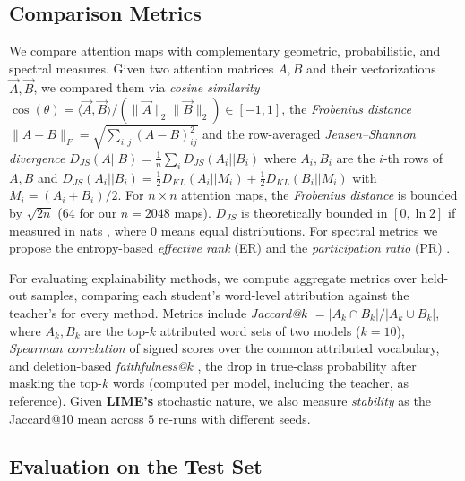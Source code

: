\documentclass[conference]{IEEEtran}
\begin{document}
\subsection{Comparison Metrics}\label{sec:metrics}

We compare attention maps with complementary geometric, probabilistic, and spectral measures. Given two attention matrices $A,B$ and their vectorizations $\vec A, \vec B$, we compared them via \textit{cosine similarity} $\cos(\theta)=\langle \vec A,\vec B\rangle/(\|\vec A\|_2\|\vec B\|_2)\in[-1,1]$, the \textit{Frobenius distance} $\|A-B\|_F=\sqrt{\sum_{i,j}(A-B)^2_{ij}}$ and the row-averaged \textit{Jensen--Shannon divergence} $D_{JS}(A||B)=\frac{1}{n}\sum_i D_{JS}(A_i||B_i)$ where $A_i, B_i$ are the $i$-th rows of $A,B$ and $D_{JS}(A_i||B_i) = \frac{1}{2}D_{KL}(A_i||M_i) + \frac{1}{2}D_{KL}(B_i||M_i)$ with $M_i = (A_i + B_i)/2$. For $n \times n$ attention maps, the \textit{Frobenius distance} is bounded by $\sqrt{2n}$ ($64$ for our $n=2048$ maps). $D_{JS}$ is theoretically bounded in $[0,\ln 2]$ if measured in nats \cite{lin1991divergence}, where $0$ means equal distributions. For spectral metrics we propose the entropy-based \textit{effective rank} (ER) \cite{roy2007effective} and the \textit{participation ratio} (PR) \cite{recanatesi2022scale}.

For evaluating explainability methods, we compute aggregate metrics over held-out samples, comparing each student's word-level attribution against the teacher's for every method. Metrics include \textit{Jaccard@$k$} $=|A_k\cap B_k|/|A_k\cup B_k|$, where $A_k,B_k$ are the top-$k$ attributed word sets of two models ($k=10$), \textit{Spearman correlation} of signed scores over the common attributed vocabulary, and deletion-based \textit{faithfulness@$k$} \cite{deyoung2020eraser}, the drop in true-class probability after masking the top-$k$ words (computed per model, including the teacher, as reference). Given \textbf{LIME's} stochastic nature, we also measure \textit{stability} as the Jaccard@10 mean across $5$ re-runs with different seeds.

\subsection{Evaluation on the Test Set}\label{sec:test-eval}
\end{document}
